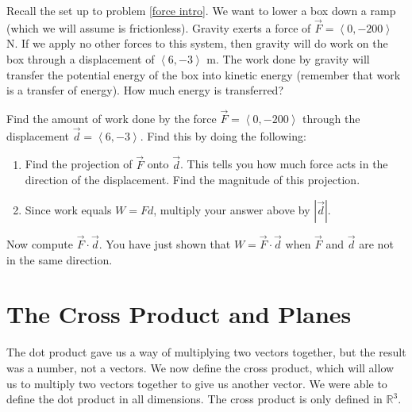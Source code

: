 Recall the set up to problem \ref{force intro}.  We want to lower a box down a ramp (which we will assume is frictionless). Gravity exerts a force of $\vec F=\left<0,-200\right>$ N. If we apply no other forces to this system, then gravity will do work on the box through a displacement of $\left<6,-3\right>$ m. The work done by gravity will transfer the potential energy of the box into kinetic energy (remember that work is a transfer of energy).  How much energy is transferred?

\begin{problem} 
Find the amount of work done by the force $\vec F=\left<0,-200\right>$ through the displacement $\vec d=\left<6,-3\right>$. Find this by doing the following:
\begin{enumerate}
\item Find the projection of $\vec F$ onto $\vec d$. This tells you how much force acts in the direction of the displacement. Find the magnitude of this projection.
\item Since work equals $W=Fd$, multiply your answer above by $|\vec {d}|$.  
\end{enumerate}
Now compute $\vec F\cdot \vec d$. You have just shown that $W=\vec F\cdot \vec d$ when $\vec F$ and $\vec d$ are not in the same direction.
\end{problem}

\section{The Cross Product and Planes}

The dot product gave us a way of multiplying two vectors together, but the result was a number, not a vectors. We now define the cross product, which will allow us to multiply two vectors together to give us another vector.  We were able to define the dot product in all dimensions.  The cross product is only defined in $\mathbb{R}^3$. 

